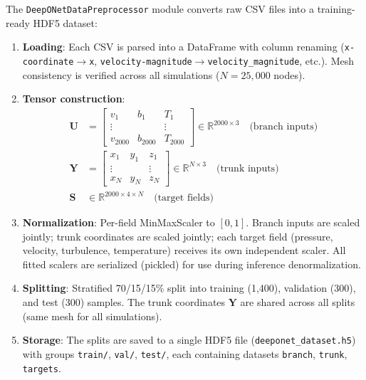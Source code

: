 \documentclass[journal]{IEEEtran}
\begin{document}
The \texttt{DeepONetDataPreprocessor} module converts raw CSV files into a training-ready HDF5 dataset:

\begin{enumerate}
    \item \textbf{Loading}: Each CSV is parsed into a DataFrame with column renaming (\texttt{x-coordinate}$\to$\texttt{x}, \texttt{velocity-magnitude}$\to$\texttt{velocity\_magnitude}, etc.). Mesh consistency is verified across all simulations ($N = 25{,}000$ nodes).
    
    \item \textbf{Tensor construction}:
    \begin{align}
    \bm{U} &= \begin{bmatrix} v_1 & b_1 & T_1 \\ \vdots & & \vdots \\ v_{2000} & b_{2000} & T_{2000} \end{bmatrix} \in \mathbb{R}^{2000 \times 3} \quad\text{(branch inputs)} \\
    \bm{Y} &= \begin{bmatrix} x_1 & y_1 & z_1 \\ \vdots & & \vdots \\ x_N & y_N & z_N \end{bmatrix} \in \mathbb{R}^{N \times 3} \quad\text{(trunk inputs)} \\
    \bm{S} &\in \mathbb{R}^{2000 \times 4 \times N} \quad\text{(target fields)}
    \end{align}
    
    \item \textbf{Normalization}: Per-field MinMaxScaler to $[0,1]$. Branch inputs are scaled jointly; trunk coordinates are scaled jointly; each target field (pressure, velocity, turbulence, temperature) receives its own independent scaler. All fitted scalers are serialized (pickled) for use during inference denormalization.
    
    \item \textbf{Splitting}: Stratified 70/15/15\% split into training (1,400), validation (300), and test (300) samples. The trunk coordinates $\bm{Y}$ are shared across all splits (same mesh for all simulations).
    
    \item \textbf{Storage}: The splits are saved to a single HDF5 file (\texttt{deeponet\_dataset.h5}) with groups \texttt{train/}, \texttt{val/}, \texttt{test/}, each containing datasets \texttt{branch}, \texttt{trunk}, \texttt{targets}.
\end{enumerate}
\end{document}
